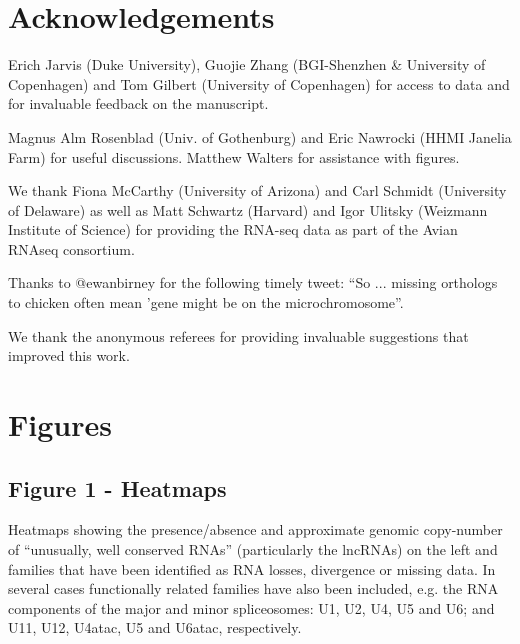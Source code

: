 \documentclass[10pt]{bmc_article}
\newenvironment{bmcformat}{\begin{raggedright}\baselineskip20pt\sloppy\setboolean{publ}{false}}{\end{raggedright}\baselineskip20pt\sloppy}
\begin{document}
\begin{bmcformat}
\section*{Acknowledgements}

Erich Jarvis (Duke University), Guojie Zhang (BGI-Shenzhen \&
University of Copenhagen) and Tom Gilbert (University of Copenhagen)
for access to data and for invaluable feedback on the manuscript.

Magnus Alm Rosenblad (Univ. of Gothenburg) and Eric Nawrocki (HHMI
Janelia Farm) for useful discussions. Matthew Walters for assistance
with figures.

We thank Fiona McCarthy (University of Arizona) and Carl
Schmidt (University of Delaware) as well as Matt Schwartz (Harvard)
and Igor Ulitsky (Weizmann Institute of Science) for providing the
RNA-seq data as part of the Avian RNAseq consortium.

Thanks to @ewanbirney for the following timely tweet: ``So ... missing
orthologs to chicken often mean 'gene might be on the
microchromosome''.


We thank the anonymous referees for providing invaluable suggestions
that improved this work. 



{
  } %


\clearpage
\newpage

\section*{Figures}
  \subsection*{Figure 1 - Heatmaps}

Heatmaps showing the presence/absence and approximate genomic
copy-number of ``unusually, well conserved RNAs'' (particularly the
lncRNAs) on the left and families that have been identified as RNA
losses, divergence or missing data. In several cases functionally
related families have also been included, e.g. the RNA components of
the major and minor spliceosomes: U1, U2, U4, U5 and U6; and U11, U12,
U4atac, U5 and U6atac, respectively.


\end{bmcformat}
\end{document}
